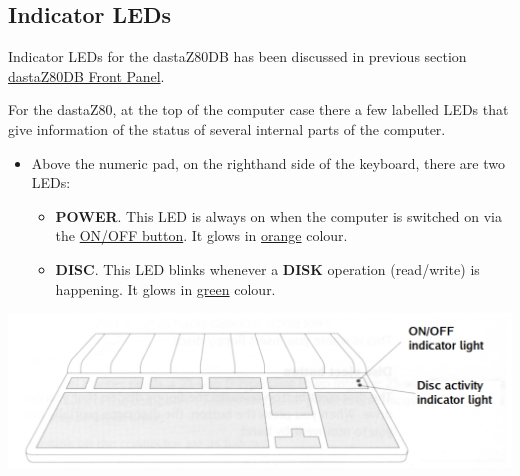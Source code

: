     \subsection{Indicator LEDs}

    Indicator LEDs for the dastaZ80DB has been discussed in previous section
    \hyperref[subsec:frontpanel]{dastaZ80DB Front Panel}.

    For the dastaZ80, at the top of the computer case there a few labelled
    LEDs that give information of the  status of several internal parts of the
    computer.

    \begin{itemize}
        \item Above the numeric pad, on the righthand side of the keyboard,
        there are two LEDs:
        \begin{itemize}
            \item \textbf{POWER}. This LED is always on when the computer is
            switched on via the \hyperref[subsec:onoffbutt]{ON/OFF button}. It glows
            in \underline{orange} colour.
            \item \textbf{DISC}. This LED blinks whenever a \textbf{DISK} operation
            (read/write) is happening. It glows in \underline{green} colour.
        \end{itemize}
    \end{itemize}
    
    \centerline{\includegraphics[scale=0.5]{images/keyboardLEDs.png}}

